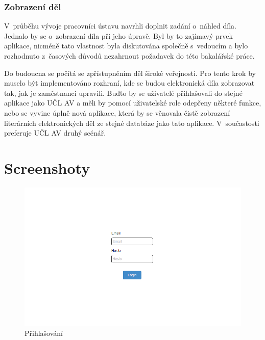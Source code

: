 \documentclass[thesis=B,czech]{FITthesis}[2012/06/26]
\begin{document}
\begin{conclusion}
        
        \subsection{Zobrazení děl}
            V~průběhu vývoje pracovníci ústavu navrhli doplnit zadání o~náhled díla. Jednalo by se o~zobrazení díla při jeho úpravě. Byl by to zajímavý prvek aplikace, nicméně tato vlastnost byla diskutována společně s~vedoucím a bylo rozhodnuto z~časových důvodů nezahrnout požadavek do této bakalářské práce.
        
            Do budoucna se počítá se zpřístupněním děl široké veřejnosti. Pro tento krok by muselo být implementováno rozhraní, kde se budou elektronická díla zobrazovat tak, jak je zaměstnanci upravili. Buďto by se uživatelé přihlašovali do stejné aplikace jako UČL AV a měli by pomocí uživatelské role odepřeny některé funkce, nebo se vyvine úplně nová aplikace, která by se věnovala čistě zobrazení literárních elektronických děl ze stejné databáze jako tato aplikace. V~součastosti preferuje UČL AV druhý scénář.

\end{conclusion}




\appendix

\chapter{Screenshoty}

    \begin {figure}[H]\centering
        \includegraphics[width=\textwidth]{images/login}
        \caption {Přihlašování}
        \label {fig:login}
    \end{figure}
\end{document}
